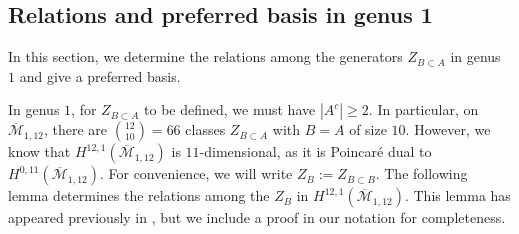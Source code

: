 \documentclass[12pt]{amsart}
\theoremstyle{definition}
\numberwithin{equation}{section}
\newcommand{\M}{\mathcal{M}}
\newcommand{\Mb}{\overline{\M}}
\theoremstyle{definition} %
\theoremstyle{remark}
\begin{document}
\subsection{Relations and preferred basis in genus 1} \label{basisg1}
In this section, we determine the relations among the generators $Z_{B \subset A}$ in genus $1$ and give a preferred basis. 

In genus $1$, for $Z_{B \subset A}$ to be defined, we must have $|A^c| \geq 2$. In particular, 
on $\Mb_{1,12}$, there are
$\binom{12}{10} = 66$ classes $Z_{B \subset A}$ with $B = A$ of size $10$. 
However, we know that $H^{12,1}(\Mb_{1,12})$ is $11$-dimensional, as it is Poincar\'e dual to $H^{0,11}(\Mb_{1,12})$. For convenience, we will write $Z_B := Z_{B \subset B}$.
The following lemma determines the relations among the $Z_B$ in $H^{12,1}(\Mb_{1,12})$.
This lemma has appeared previously in \cite[Proposition 5]{GraberPandharipande}, but we include a proof in our notation for completeness.
\end{document}

